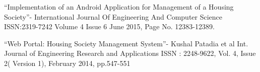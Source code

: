 \newpage
{}
\renewcommand{\bibname}{References}
\begin{thebibliography}{99}


“Implementation of an Android Application for Management of a Housing Society”- International Journal Of Engineering And Computer Science ISSN:2319-7242 Volume 4 Issue 6 June 2015, Page No. 12383-12389.

	“Web Portal: Housing Society Management System”- Kushal Patadia et al Int. Journal of
Engineering Research and Applications ISSN : 2248-9622, Vol. 4, Issue 2( Version 1), February 2014, pp.547-551



\end{thebibliography}

